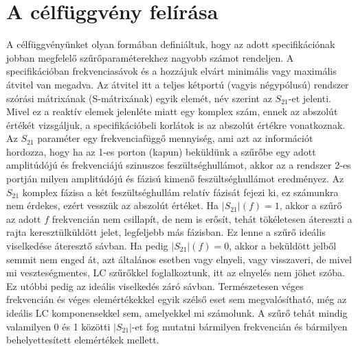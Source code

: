 \section{A célfüggvény felírása}
\label{sec:celfuggveny}
    A célfüggvényünket olyan formában definiáltuk, hogy az adott specifikációnak jobban megfelelő szűrőparaméterekhez nagyobb számot rendeljen. A specifikációban frekvenciasávok és a hozzájuk elvárt minimális vagy maximális átvitel van megadva. Az átvitel itt a teljes kétportú (vagyis négypólusú) rendszer szórási mátrixának (S-mátrixának) egyik elemét, név szerint az $S_{21}$-et jelenti. Mivel ez a reaktív elemek jelenléte miatt egy komplex szám, ennek az abszolút értékét vizsgáljuk, a specifikációbeli korlátok is az abszolút értékre vonatkoznak. Az $S_{21}$ paraméter egy frekvenciafüggő mennyiség, ami azt az információt hordozza, hogy ha az 1-es porton (kapun) beküldünk a szűrőbe egy adott amplitúdójú és frekvenciájú szinuszos feszültséghullámot, akkor az a rendszer 2-es portján milyen amplitúdójú és fázisú kimenő feszültséghullámot eredményez. Az $S_{21}$ komplex fázisa a két feszültséghullám relatív fázisát fejezi ki, ez számunkra nem érdekes, ezért vesszük az abszolút értéket. Ha $|S_{21}|(f) = 1$, akkor a szűrő az adott $f$ frekvencián nem csillapít, de nem is erősít, tehát tökéletesen átereszti a rajta keresztülküldött jelet, legfeljebb más fázisban. Ez lenne a szűrő ideális viselkedése áteresztő sávban. Ha pedig $|S_{21}|(f) = 0$, akkor a beküldött jelből semmit nem enged át, azt általános esetben vagy elnyeli, vagy visszaveri, de mivel mi veszteségmentes, LC szűrőkkel foglalkoztunk, itt az elnyelés nem jöhet szóba. Ez utóbbi pedig az ideális viselkedés záró sávban. Természetesen véges frekvencián és véges elemértékekkel egyik szélső eset sem megvalósítható, még az ideális LC komponensekkel sem, amelyekkel mi számolunk. A szűrő tehát mindig valamilyen 0 és 1 közötti $|S_{21}|$-et fog mutatni bármilyen frekvencián és bármilyen behelyettesített elemértékek mellett.

